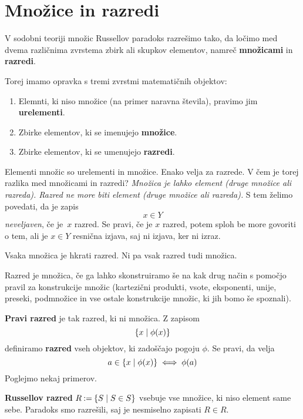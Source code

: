 \section{Množice in razredi}

V sodobni teoriji množic Russellov paradoks razrešimo tako, da ločimo med dvema
različnima zvrstema zbirk ali skupkov elementov, namreč \textbf{množicami} in \textbf{razredi}.

Torej imamo opravka s tremi zvrstmi matematičnih objektov:
%
\begin{enumerate}
\item Elemnti, ki niso množice (na primer naravna števila), pravimo jim \textbf{urelementi}.
\item Zbirke elementov, ki se imenujejo \textbf{množice}.
\item Zbirke elementov, ki se umenujejo \textbf{razredi}.
\end{enumerate}
%
Elementi množic so urelementi in množice. Enako velja za razrede.
%
V čem je torej razlika med množicami in razredi?
%
\emph{Množica je lahko element (druge množice ali razreda).
Razred ne more biti element (druge množice ali razreda).}
%
S tem želimo povedati, da je zapis
%
\begin{equation*}
    x \in Y
  \end{equation*}
%
\emph{neveljaven}, če je~$x$ razred. Se pravi, če je $x$ razred, potem sploh be more govoriti o tem, ali je $x \in Y$ resnična izjava, saj ni izjava, ker ni izraz.

Vsaka množica je hkrati razred. Ni pa vsak razred tudi množica.

Razred je množica, če ga lahko skonstruiramo še na kak drug način s pomočjo
pravil za konstrukcije množic (kartezični produkti, vsote, eksponenti, unije,
preseki, podmnožice in vse ostale konstrukcije množic, ki jih bomo še spoznali).

\textbf{Pravi razred} je tak razred, ki ni množica.
%
Z zapisom
%
\begin{equation*}
  \left\{ x \; \middle| \; \phi(x) \right\}
\end{equation*}
%
definiramo \textbf{razred} vseh objektov, ki zadoščajo pogoju $\phi$. Se pravi, da velja
%
\begin{equation*}
    a \in \left\{ x \; \middle| \; \phi(x) \right\} \iff \phi(a)
\end{equation*}
%
Poglejmo nekaj primerov.

\begin{primer}
  \textbf{Russellov razred} $R \mathbin{{:}{=}} \left\{ S \; \middle| \; S \in S \right\}$ vsebuje vse množice, ki niso element same sebe. Paradoks smo razrešili, saj je nesmiselno zapisati $R \in R$.
\end{primer}


